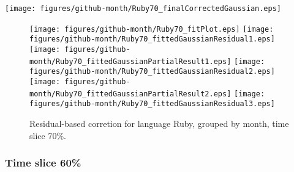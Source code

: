 \begin{center}
{\texttt{[image: figures/github-month/Ruby70\_finalCorrectedGaussian.eps]}}
\end{center}

\FloatBarrier

\begin{figure}[t]
\centering
{}
{\texttt{[image: figures/github-month/Ruby70\_fitPlot.eps]}}
{\texttt{[image: figures/github-month/Ruby70\_fittedGaussianResidual1.eps]}}
{\texttt{[image: figures/github-month/Ruby70\_fittedGaussianPartialResult1.eps]}}
{\texttt{[image: figures/github-month/Ruby70\_fittedGaussianResidual2.eps]}}
{\texttt{[image: figures/github-month/Ruby70\_fittedGaussianPartialResult2.eps]}}
{\texttt{[image: figures/github-month/Ruby70\_fittedGaussianResidual3.eps]}}
\caption{Residual-based corretion for language Ruby, grouped by month, time slice 70\%.}
\end{figure}


\FloatBarrier


\subsubsection{Time slice 60\%}

